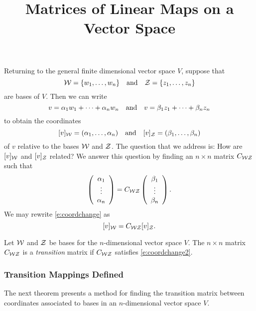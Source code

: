 \documentclass{ximera}
\title{Matrices of Linear Maps on a Vector Space}
\begin{document}
\begin{abstract}
\end{abstract}
\maketitle

  \label{MALT}
  


Returning to the general finite dimensional vector space $V$, suppose that
\[
{\cal W} = \{w_1,\ldots,w_n\} \quad\mbox{and}\quad {\cal Z} = \{z_1,\ldots,z_n\}
\]
are bases of $V$.  Then we can write
\[
v = \alpha_1 w_1 + \cdots + \alpha_n w_n \quad\mbox{and}\quad
v = \beta_1 z_1 + \cdots + \beta_n z_n
\]
to obtain the coordinates
\begin{equation}  \label{e:vincoords}
[v]_{\cal W} = (\alpha_1,\ldots,\alpha_n) \quad\mbox{and}\quad
[v]_{\cal Z} = (\beta_1,\ldots,\beta_n)
\end{equation}
of $v$ relative to the bases ${\cal W}$ and ${\cal Z}$.  The question that
we address is: How are $[v]_{\cal W}$ and $[v]_{\cal Z}$ related?  We answer
this question by finding an $n\times n$ matrix $C_{{\cal W}{\cal Z}}$ such that
\begin{equation} \label{e:coordchange}
\left(\begin{array}{c} \alpha_1 \\ \vdots \\ \alpha_{n}\end{array}\right) = C_{{\cal W}{\cal Z}} \left(\begin{array}{c} \beta_1 \\ \vdots \\ \beta_{n}\end{array}\right).
\end{equation}
We may rewrite \eqref{e:coordchange} as
\begin{equation}  \label{e:coordchange2}
[v]_{\cal W} = C_{{\cal W}{\cal Z}}[v]_{\cal Z}.
\end{equation}

\begin{definition}
Let ${\cal W}$ and ${\cal Z}$ be bases for the $n$-dimensional
vector space $V$.  The $n\times n$ matrix $C_{{\cal W}{\cal Z}}$
is a {\em transition\/} matrix if $C_{{\cal W}{\cal Z}}$ satisfies
\eqref{e:coordchange2}.
\end{definition}  


\subsubsection*{Transition Mappings Defined}

The next theorem presents a method for finding the transition matrix
between coordinates associated to bases in an $n$-dimensional vector
space $V$.
\end{document}
